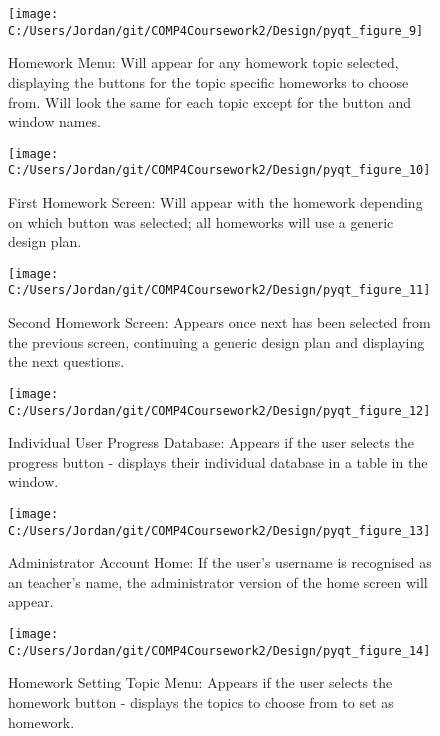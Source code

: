 \begin{figure}[H]
    \label{fig:print_function_result}\caption{Homework Menu: Will appear for any homework topic selected, displaying the buttons for the topic specific homeworks to choose from. Will look the same for each topic except for the button and window names.}
    \texttt{[image: C:/Users/Jordan/git/COMP4Coursework2/Design/pyqt\_figure\_9]}
\end{figure}

\begin{figure}[H]
    \label{fig:print_function_result}\caption{First Homework Screen: Will appear with the homework depending on which button was selected; all homeworks will use a generic design plan.}
    \texttt{[image: C:/Users/Jordan/git/COMP4Coursework2/Design/pyqt\_figure\_10]}
\end{figure}

\begin{figure}[H]
    \label{fig:print_function_result}\caption{Second Homework Screen: Appears once next has been selected from the previous screen, continuing a generic design plan and displaying the next questions.}
    \texttt{[image: C:/Users/Jordan/git/COMP4Coursework2/Design/pyqt\_figure\_11]}
\end{figure}

\begin{figure}[H]
    \label{fig:print_function_result}\caption{Individual User Progress Database: Appears if the user selects the progress button - displays their individual database in a table in the window.}
    \texttt{[image: C:/Users/Jordan/git/COMP4Coursework2/Design/pyqt\_figure\_12]}
\end{figure}

\begin{figure}[H]
    \label{fig:print_function_result}\caption{Administrator Account Home: If the user's username is recognised as an teacher's name, the administrator version of the home screen will appear.}
    \texttt{[image: C:/Users/Jordan/git/COMP4Coursework2/Design/pyqt\_figure\_13]}
\end{figure}

\begin{figure}[H]
    \label{fig:print_function_result}\caption{Homework Setting Topic Menu: Appears if the user selects the homework button - displays the topics to choose from to set as homework.}
    \texttt{[image: C:/Users/Jordan/git/COMP4Coursework2/Design/pyqt\_figure\_14]}
\end{figure}

